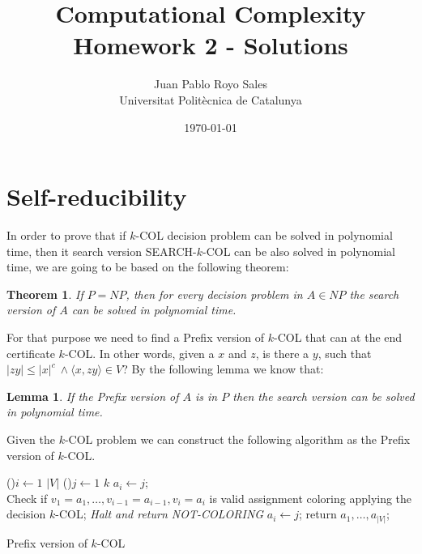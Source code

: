 \documentclass[12pt, a4paper]{article}
\title{%
  Computational Complexity \\
  Homework 2 - Solutions
}
\author{%
  Juan Pablo Royo Sales\\
  \small{Universitat Politècnica de Catalunya}
}
\date\today
\begin{document}
\maketitle

\section{Self-reducibility}

In order to prove that if $k$-COL decision problem can be solved in polynomial time, then it search version SEARCH-$k$-COL can be also solved in polynomial time, we are going to be based on the following theorem:

\newtheorem{searchpnp}{Theorem}
\begin{searchpnp}
  If $P = NP$, then for every decision problem in $A \in NP$ the search version of $A$ can be solved in polynomial time.
\end{searchpnp}

For that purpose we need to find a Prefix version of $k$-COL that can at the end certificate $k$-COL\@. In other words, given a $x$ and $z$, is there a $y$, such that $|zy| \leq |x|^c\ \land \langle x,zy \rangle \in V$?
By the following lemma we know that:

\newtheorem{lemmasearch}{Lemma}
\begin{lemmasearch}
  If the Prefix version of $A$ is in $P$ then the search version can be solved in polynomial time.
\end{lemmasearch}

Given the $k$-COL problem we can construct the following algorithm as the Prefix version of $k$-COL.

\begin{algorithm}[H]
  \For(){$i \leftarrow 1$ \KwTo $|V|$}
  {\For(){$j \leftarrow 1$ \KwTo $k$}
    {$a_i \leftarrow j$; \\
      Check if $v_1 = a_1, \dots, v_{i-1} = a_{i-1}, v_i = a_i$ is valid assignment coloring applying the decision $k$-COL;\label{polytime}
    }
    {\emph{Halt and return NOT-COLORING}
    }
    {$a_i \leftarrow j$; }
  }
  return $a_1,\dots,a_{|V|}$;
  \caption{Prefix version of $k$-COL}
\end{algorithm}
\end{document}
